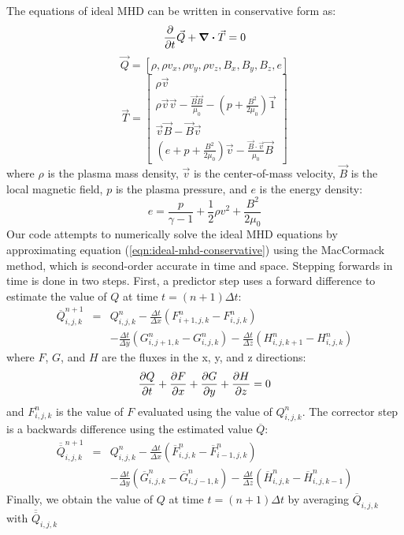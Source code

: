 \documentclass[%
 reprint,
 amsmath,amssymb,
 aps,
]{revtex4-2}
\begin{document}
The equations of ideal MHD can be written in conservative form as:
\begin{equation}
\pdv{}{t}\vec Q + \div \vec T = 0 
\end{equation}
\begin{equation}
\vec Q = [\rho, \rho v_x, \rho v_y, \rho v_z, B_x, B_y, B_z, e]
\end{equation}
\begin{equation}
\vec T = \begin{bmatrix}
\rho \vec v \\
\rho \vec v \vec v - \frac{\vec B \vec B}{\mu_0} - \left( p + \frac{B^2}{2 \mu_0} \right) \vec{1} \\
\vec v \vec B - \vec B \vec v \\
\left( e + p + \frac{B^2}{2 \mu_0} \right) \vec v - \frac{\vec B \cdot \vec v}{\mu_0} \vec B \label{eqn:ideal-mhd-conservative}
\end{bmatrix}
\end{equation}
where $\rho$ is the plasma mass density, $\vec v$ is the center-of-mass velocity, $\vec B$ is the local magnetic field, $p$ is the plasma pressure, and $e$ is the energy density:
\begin{equation}
e = \frac{p}{\gamma - 1} + \frac{1}{2} \rho v^2 + \frac{B^2}{2 \mu_0}
\end{equation}
Our code attempts to numerically solve the ideal MHD equations by approximating equation (\ref{eqn:ideal-mhd-conservative}) using the MacCormack method, which is second-order accurate in time and space. Stepping forwards in time is done in two steps. First, a predictor step uses a forward difference to estimate the value of $Q$ at time $t = (n+1)\Delta t$:
\begin{eqnarray*}
\overline{Q} _{i,j,k} ^{n+1} & = & Q_{i,j,k} ^n - \frac{\Delta t}{\Delta x} (F_{i+1, j, k}^n - F_{i, j, k} ^n) \\
& & - \frac{\Delta t}{\Delta y} (G_{i, j+1, k} ^n - G_{i, j, k} ^n) - \frac{\Delta t}{\Delta z} (H_{i, j, k+1} ^n - H_{i, j, k} ^n)
\end{eqnarray*}
where $F$, $G$, and $H$ are the fluxes in the x, y, and z directions:
\begin{equation}
\pdv{Q}{t} + \pdv{F}{x} + \pdv{G}{y} + \pdv{H}{z} = 0
\end{equation}
and $F_{i, j, k} ^n$ is the value of $F$ evaluated using the value of $Q_{i, j, k} ^n$. The corrector step is a backwards difference using the estimated value  $\overline{Q}$:
\begin{eqnarray*}
\overline{\overline{Q}} _{i,j,k} ^{n+1} & = & Q_{i,j,k} ^n - \frac{\Delta t}{\Delta x} (\overline{F}_{i, j, k}^n - \overline{F}_{i-1, j, k} ^n ) \\
& & - \frac{\Delta t}{\Delta y} (\overline{G}_{i, j, k} ^n - \overline{G}_{i, j-1, k} ^n) - \frac{\Delta t}{\Delta z} (\overline{H}_{i, j, k} ^n - \overline{H}_{i, j, k-1} ^n)
\end{eqnarray*}
Finally, we obtain the value of $Q$ at time $t = (n+1) \Delta t$ by averaging $\overline{Q}_{i,j,k}$ with $\overline{\overline{Q}}_{i,j,k}$
\end{document}
